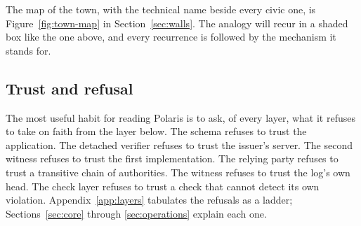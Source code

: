 
The map of the town, with the technical name beside every civic one, is Figure~\ref{fig:town-map}
in Section~\ref{sec:walls}. The analogy will recur in a shaded box like the one above, and every
recurrence is followed by the mechanism it stands for.

\subsection{Trust and refusal}

The most useful habit for reading Polaris is to ask, of every layer, what it refuses to take on
faith from the layer below. The schema refuses to trust the application. The detached verifier
refuses to trust the issuer's server. The second witness refuses to trust the first implementation.
The relying party refuses to trust a transitive chain of authorities. The witness refuses to trust
the log's own head. The check layer refuses to trust a check that cannot detect its own violation.
Appendix~\ref{app:layers} tabulates the refusals as a ladder; Sections~\ref{sec:core} through
\ref{sec:operations} explain each one.
